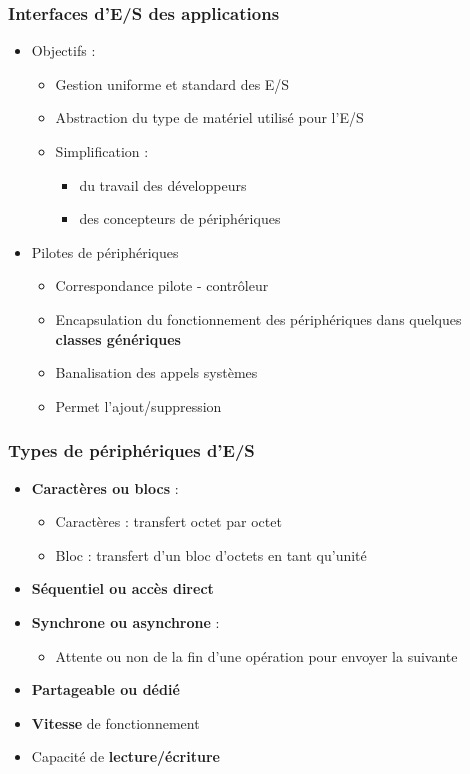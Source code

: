 \begin{frame}
\frametitle{Interfaces d'E/S des applications}
\begin{itemize}
\item Objectifs : 
\begin{itemize}
\item Gestion uniforme et standard des E/S
\item Abstraction du type de matériel utilisé pour l'E/S
\item Simplification :
\begin{itemize}
\item du travail des développeurs
\item des concepteurs de périphériques
\end{itemize}
\end{itemize}

\item Pilotes de périphériques
\begin{itemize}
\item Correspondance pilote - contrôleur
\item Encapsulation du fonctionnement des périphériques dans quelques \textbf{classes génériques}
\item Banalisation des appels systèmes
\item Permet l'ajout/suppression
\end{itemize}
\end{itemize}
\end{frame}

\begin{frame}
\frametitle{Types de périphériques d'E/S}
\begin{itemize}
\item \textbf{Caractères ou blocs} :
\begin{itemize}
\item Caractères : transfert octet par octet
\item Bloc : transfert d'un bloc d'octets en tant qu'unité
\end{itemize}
\item \textbf{Séquentiel ou accès direct}
\item \textbf{Synchrone ou asynchrone} :
\begin{itemize}
\item Attente ou non de la fin d'une opération pour envoyer la suivante
\end{itemize}
\item \textbf{Partageable ou dédié}
\item \textbf{Vitesse} de fonctionnement
\item Capacité de \textbf{lecture/écriture}
\end{itemize}
\end{frame}

